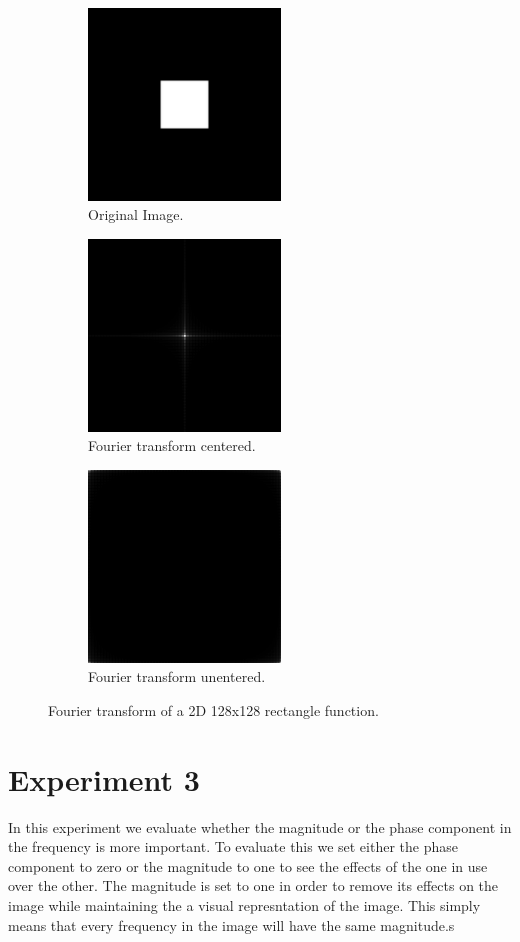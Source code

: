 \documentclass[letter]{article}
\begin{document}
\begin{figure}[hbtp]
  \centering
  \begin{subfigure}{5.1cm}
    \includegraphics[width=5.1cm]{images/rect_512_128x128.png}
    \caption{Original Image.}
  \end{subfigure}
  \begin{subfigure}{5.1cm}
    \includegraphics[width=5.1cm]{images/rect_512_128x128_FU_centered.png}
    \caption{Fourier transform centered.}
  \end{subfigure}
  \begin{subfigure}{5.1cm}
    \includegraphics[width=5.1cm]{images/rect_512_128x128_FU.png}
    \caption{Fourier transform unentered.}
  \end{subfigure}
  \caption{Fourier transform of a 2D 128x128 rectangle function.}
  \label{fig:ft_128128}
\end{figure}
\section{Experiment 3}
In this experiment we evaluate whether the magnitude or the phase component in the frequency is more important. To evaluate this we set either the phase component to zero or the magnitude to one to see the effects of the one in use over the other. The magnitude is set to one in order to remove its effects on the image while maintaining the a visual represntation of the image. This simply means that every frequency in the image will have the same magnitude.s
\end{document}
